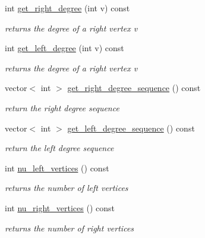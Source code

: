 \begin{DoxyCompactItemize}
int \hyperlink{classb__graph_a1caf2e1ca8ee19e7407f489be6b171b8}{get\+\_\+right\+\_\+degree} (int v) const
\begin{DoxyCompactList}\small\item\em returns the degree of a right vertex v \end{DoxyCompactList}\item 
int \hyperlink{classb__graph_ac64ac5cb1197d8008e07babc333eb3ea}{get\+\_\+left\+\_\+degree} (int v) const
\begin{DoxyCompactList}\small\item\em returns the degree of a right vertex v \end{DoxyCompactList}\item 
vector$<$ int $>$ \hyperlink{classb__graph_a2711566385b92b02f4c03abdc1f9a582}{get\+\_\+right\+\_\+degree\+\_\+sequence} () const
\begin{DoxyCompactList}\small\item\em return the right degree sequence \end{DoxyCompactList}\item 
vector$<$ int $>$ \hyperlink{classb__graph_afd65fb655f7e24217393a10533b87d3c}{get\+\_\+left\+\_\+degree\+\_\+sequence} () const
\begin{DoxyCompactList}\small\item\em return the left degree sequence \end{DoxyCompactList}\item 
int \hyperlink{classb__graph_a5e71d5c97f2501b0b93c17146cf7e68e}{nu\+\_\+left\+\_\+vertices} () const
\begin{DoxyCompactList}\small\item\em returns the number of left vertices \end{DoxyCompactList}\item 
int \hyperlink{classb__graph_abecfd7d6fbd0d9a554fe0d9aa3241a04}{nu\+\_\+right\+\_\+vertices} () const
\begin{DoxyCompactList}\small\item\em returns the number of right vertices \end{DoxyCompactList}\end{DoxyCompactItemize}
